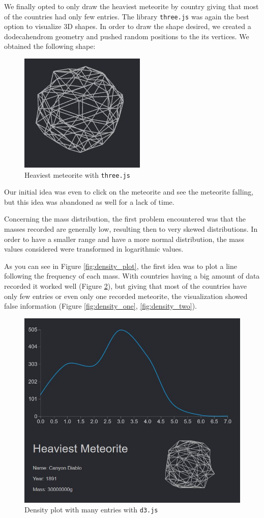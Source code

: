 \documentclass[10pt,conference,compsocconf]{IEEEtran}
\begin{document}
We finally opted to only draw the heaviest meteorite by country giving that most of the countries had only few entries. The library \texttt{three.js} was again the best option to visualize 3D shapes. In order to draw the shape desired, we created a dodecahendrom geometry and pushed random positions to the its vertices. We obtained the following shape: 

\begin{figure}[H]
  \centering
  \includegraphics[width=.5\columnwidth]{images/biggestmeteorite}
  \vspace{-3mm}
  \caption{Heaviest meteorite with \texttt{three.js}}
  \label{fig:sketch_biggest}
\end{figure}

Our initial idea was even to click on the meteorite and see the meteorite falling, but this idea was abandoned as well for a lack of time. 

Concerning the mass distribution, the first problem encountered was that the masses recorded are generally low, resulting then to very skewed distributions. In order to have a smaller range and have a more normal distribution, the mass values considered were transformed in logarithmic values. 


As you can see in Figure \ref{fig:density_plot}, the first idea was to plot a line following the frequency of each mass. With countries having a big amount of data recorded it worked well (Figure \ref{fig:density_good}), but giving that most of the countries have only few entries or even only one recorded meteorite, the visualization showed false information (Figure \ref{fig:density_one}, \ref{fig:density_two}).

\begin{figure}[H]
  \centering
  \includegraphics[width=.5\columnwidth]{images/good_density_plot}
  \vspace{-3mm}
  \caption{Density plot with many entries with \texttt{d3.js}}
  \label{fig:density_good}
\end{figure}
\end{document}
